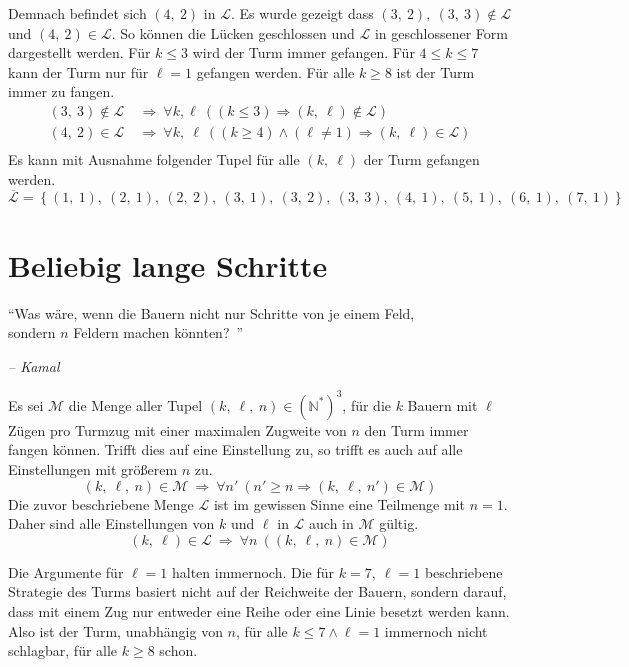\documentclass[a4paper, 11pt]{scrartcl}
\begin{document}
Demnach befindet sich $(4,\ 2)$ in $\mathcal{L}$.
\newpage
Es wurde gezeigt dass $(3,\ 2),\ (3,\ 3) \notin \mathcal{L}$ und $(4,\ 2) \in \mathcal{L}$. So können die Lücken geschlossen und $\mathcal{L}$ in geschlossener Form dargestellt werden. Für $k \leq 3$ wird der Turm immer gefangen. Für $4 \leq k \leq 7$ kann der Turm nur für $\ell = 1$ gefangen werden. Für alle $k \geq 8$ ist der Turm immer zu fangen.
\begin{align*}
	(3,\ 3) \notin \mathcal{L} \:&\Rightarrow\: \forall k,\ell\ \left( (k \leq 3) \Rightarrow (k,\ \ell) \notin \mathcal{L} \right) \tag{$\ell \leq k \leq 3$} \\
	(4,\ 2) \in \mathcal{L} \:&\Rightarrow\: \forall k,\ \ell\ \left( (k \geq 4) \wedge (\ell \neq 1) \Rightarrow (k,\ \ell) \in \mathcal{L} \right) \\
\end{align*}
Es kann mit Ausnahme folgender Tupel für alle $(k,\ \ell)$ der Turm gefangen werden.
\[
	\overline{\mathcal{L}} = \left\{ (1,\ 1),\ (2,\ 1),\ (2,\ 2),\ (3,\ 1),\ (3,\ 2),\ (3,\ 3),\ (4,\ 1),\ (5,\ 1),\ (6,\ 1),\ (7,\ 1) \right\}
\]

\section*{Beliebig lange Schritte}
\begin{framed}
	\centering
	"`Was wäre, wenn die Bauern nicht nur Schritte von je einem Feld,\\sondern $n$ Feldern machen könnten?\ "'
	\begin{flushright}
		\itshape -- Kamal		
	\end{flushright}
\end{framed}

Es sei $\mathcal{M}$ die Menge aller Tupel $(k,\ \ell,\ n) \in ({\mathbb{N}^*})^3$, für die $k$ Bauern mit $\ell$ Zügen pro Turmzug mit einer maximalen Zugweite von $n$ den Turm immer fangen können. Trifft dies auf eine Einstellung zu, so trifft es auch auf alle Einstellungen mit größerem $n$ zu.
\[ (k,\ \ell,\ n) \in \mathcal{M} \:\Rightarrow\: \forall n'\ (n' \geq n \Rightarrow (k,\ \ell,\ n') \in \mathcal{M}) \]
Die zuvor beschriebene Menge $\mathcal{L}$ ist im gewissen Sinne eine Teilmenge mit $n = 1$. Daher sind alle Einstellungen von $k$ und $\ell$ in $\mathcal{L}$ auch in $\mathcal{M}$ gültig.
\[ (k,\ \ell) \in \mathcal{L} \:\Rightarrow\:  \forall n\ ((k,\ \ell,\ n) \in \mathcal{M}) \]

Die Argumente für $\ell = 1$ halten immernoch. Die für $k=7,\ \ell=1$ beschriebene Strategie des Turms basiert nicht auf der Reichweite der Bauern, sondern darauf, dass mit einem Zug nur entweder eine Reihe oder eine Linie besetzt werden kann. Also ist der Turm, unabhängig von $n$, für alle $k \leq 7 \wedge \ell = 1$ immernoch nicht schlagbar, für alle $k \geq 8$ schon.
\end{document}

